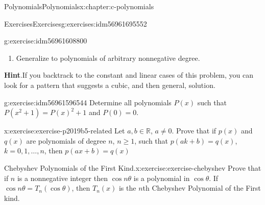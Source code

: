 \documentclass[twoside,10pt,]{book}
\newcommand{\blocktitlefont}{\relax}
\numberwithin{equation}{section}
\newcommand{\RR}{\mathbb{R}}
\begin{document}
\begin{chapterptx}{Polynomials}{}{Polynomials}{}{}{x:chapter:c-polynomials}
\begin{exercises-section}{Exercises}{}{Exercises}{}{}{g:exercises:idm56961695552}
\begin{divisionexercise}{12}{}{}{g:exercise:idm56961608800}
\begin{enumerate}[label=(\alph*)]
\item{}Generalize to polynomials of arbitrary nonnegative degree.%
\end{enumerate}
%
\par\smallskip%
\noindent\textbf{\blocktitlefont Hint}.\hypertarget{g:hint:idm56961603008}{}\quad{}If you backtrack to the constant and linear cases of this problem, you can look for a pattern that suggests a cubic, and then general, solution.%
\end{divisionexercise}%
\begin{divisionexercise}{13}{}{}{g:exercise:idm56961596544}%
Determine all polynomials \(P(x)\) such that \(P\left(x^2+1\right)=P(x)^2+1\) and \(P(0)=0\).%
\end{divisionexercise}%
\begin{divisionexercise}{14}{}{}{x:exercise:exercise-p2019b5-related}%
Let \(a, b \in \RR\), \(a \neq 0\). Prove that if \(p(x)\) and \(q(x)\) are polynomials of degree \(n\), \(n \geq 1\), such that \(p(a k +b)=q(x)\), \(k = 0, 1, \dots, n\), then \(p(a x + b)=q(x)\)%
\end{divisionexercise}%
\begin{divisionexercise}{15}{Chebyshev Polynomials of the First Kind.}{}{x:exercise:exercise-chebyshev}%
%
Prove that if \(n\) is a nonnegative integer then \(\cos{n \theta}\)  is a polynomial in \(\cos{\theta}\). If \(\cos{n \theta} = T_n(\cos{\theta})\), then \(T_n(x)\) is the \(n\)th Chebyshev Polynomial of the First kind.%
\end{divisionexercise}%
\end{exercises-section}
\end{chapterptx}
%
%
\typeout{************************************************}
\typeout{************************************************}
%
\end{document}
